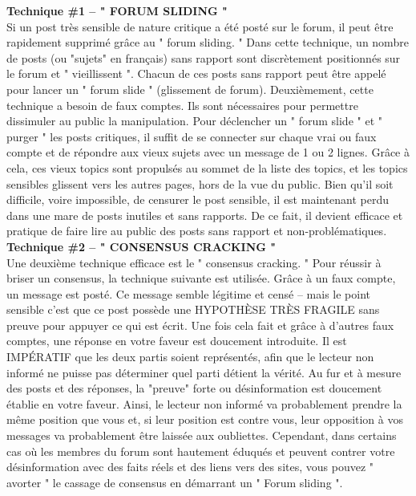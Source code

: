 \documentclass[11pt,twoside,a4paper]{article}
\begin{document}
\textbf{\large Technique \#1 -- " FORUM SLIDING "}~\\

Si un post tr{\`e}s sensible de nature critique a {\'e}t{\'e} post{\'e} sur le forum, il peut {\^e}tre rapidement supprim{\'e} gr{\^a}ce au " forum sliding. " Dans cette technique, un nombre de posts (ou "sujets" en fran\c{c}ais) sans rapport sont discr{\`e}tement positionn{\'e}s sur le forum et " vieillissent ". Chacun de ces posts sans rapport peut {\^e}tre appel{\'e} pour lancer un " forum slide " (glissement de forum). Deuxi{\`e}mement, cette technique a besoin de faux comptes. Ils sont n{\'e}cessaires pour permettre dissimuler au public la manipulation. Pour d{\'e}clencher un " forum slide " et " purger " les posts critiques, il suffit de se connecter sur chaque vrai ou faux compte et de r{\'e}pondre aux vieux sujets avec un message de 1 ou 2 lignes. Gr{\^a}ce {\`a} cela, ces vieux topics sont propuls{\'e}s au sommet de la liste des topics, et les topics sensibles glissent vers les autres pages, hors de la vue du public. Bien qu'il soit difficile, voire impossible, de censurer le post sensible, il est maintenant perdu dans une mare de posts inutiles et sans rapports. De ce fait, il devient efficace et pratique de faire lire au public des posts sans rapport et non-probl{\'e}matiques.~\\

\textbf{\large Technique \#2 -- " CONSENSUS CRACKING "}~\\

Une deuxi{\`e}me technique efficace est le " consensus cracking. " Pour r{\'e}ussir {\`a} briser un consensus, la technique suivante est utilis{\'e}e. Gr{\^a}ce {\`a} un faux compte, un message est post{\'e}. Ce message semble l{\'e}gitime et cens{\'e} -- mais le point sensible c'est que ce post poss{\`e}de une HYPOTH{\`E}SE TR{\`E}S FRAGILE sans preuve pour appuyer ce qui est {\'e}crit. Une fois cela fait et gr{\^a}ce {\`a} d'autres faux comptes, une r{\'e}ponse en votre faveur est doucement introduite. Il est IMP{\'E}RATIF que les deux partis soient repr{\'e}sent{\'e}s, afin que le lecteur non inform{\'e} ne puisse pas d{\'e}terminer quel parti d{\'e}tient la v{\'e}rit{\'e}. Au fur et {\`a} mesure des posts et des r{\'e}ponses, la "preuve" forte ou d{\'e}sinformation est doucement {\'e}tablie en votre faveur. Ainsi, le lecteur non inform{\'e} va probablement prendre la m{\^e}me position que vous et, si leur position est contre vous, leur opposition {\`a} vos messages va probablement {\^e}tre laiss{\'e}e aux oubliettes. Cependant, dans certains cas o{\`u} les membres du forum sont hautement {\'e}duqu{\'e}s et peuvent contrer votre d{\'e}sinformation avec des faits r{\'e}els et des liens vers des sites, vous pouvez " avorter " le cassage de consensus en d{\'e}marrant un " Forum sliding ".~\\
\end{document}
